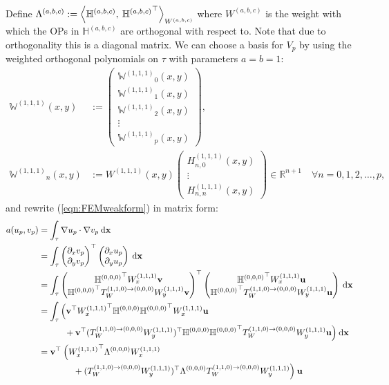 \documentclass[11pt, oneside]{article}   	%
\newcommand{\R}{\mathbb{R}}
\newcommand{\hdop}{H}
\newcommand{\bighdop}{\mathbb{\hdop}}
\newcommand{\element}{\tau}
\newcommand{\Wabc}{{W^{(a,b,c)}}}
\newcommand{\Wiii}{W^{(1,1,1)}}
\newcommand{\hdopiii}{\hdop^{(1,1,1)}}
\newcommand{\bighdopooo}{{\mathbb{\hdop}^{(0,0,0)}}}
\newcommand{\bigWiii}{{\mathbb{W}^{(1,1,1)}}}
\begin{document}
Define $\Lambda^{(a,b,c)} :=  \ip< \bighdop^{(a,b,c)}, \: {\bighdop^{(a,b,c)}}^\top >_{\Wabc}$ where $\Wabc$ is the weight with which the OPs in $\bighdop^{(a,b,c)}$ are orthogonal with respect to. Note that due to orthogonality this is a diagonal matrix. We can choose a basis for $V_p$ by using the weighted orthogonal polynomials on $\element$ with parameters $a = b = 1$:
\begin{align*}
\bigWiii(x,y) &:= \begin{pmatrix}
		\bigWiii_0(x,y) \\
		\bigWiii_1(x,y) \\
		\bigWiii_2(x,y) \\
		\vdots \\
		\bigWiii_p(x,y)
	\end{pmatrix}, \\
\bigWiii_n(x,y) &:=  \Wiii(x,y) \begin{pmatrix}
						\hdopiii_{n,0}(x,y) \\
						\vdots \\
						\hdopiii_{n,n}(x,y)
					\end{pmatrix} \in \R^{n+1} \quad \forall n = 0,1,2,\dots,p,
\end{align*}
and rewrite (\ref{eqn:FEMweakform}) in matrix form:
\begin{align*}
	a(u_p,v_p) &= \int_\element \nabla u_p \cdot \nabla v_p \: \D \mathbf{x} \\
	&= \int_\element \begin{pmatrix}
					\partial_x v_p \\
					\partial_y v_p
				\end{pmatrix}^\top 
				\begin{pmatrix}
					\partial_x u_p \\
					\partial_y u_p
				\end{pmatrix} \: \D \mathbf{x}
				\\
	&= \int_\element \begin{pmatrix}
					\bighdopooo^\top \Wiii_x \mathbf{v} \\
					\bighdopooo^\top T_W^{(1,1,0)\to(0,0,0)} \Wiii_y \mathbf{v}
				\end{pmatrix}^\top 
				\begin{pmatrix}
					\bighdopooo^\top \Wiii_x \mathbf{u} \\
					\bighdopooo^\top T_W^{(1,1,0)\to(0,0,0)} \Wiii_y \mathbf{u}
				\end{pmatrix} \: \D \mathbf{x}
				\\
	&= \int_\element \Big( \mathbf{v}^\top {\Wiii_x}^\top \bighdopooo \bighdopooo^\top \Wiii_x \mathbf{u} \nonumber \\
					& \quad \quad \quad + \mathbf{v}^\top ({T_W^{(1,1,0)\to(0,0,0)} \Wiii_y})^\top \bighdopooo \bighdopooo^\top T_W^{(1,1,0)\to(0,0,0)} \Wiii_y \mathbf{u}  \Big) \: \D \mathbf{x} \\
	&= \mathbf{v}^\top \: \Big( {\Wiii_x}^\top \Lambda^{(0,0,0)} \Wiii_x \\
	& \quad \quad \quad \quad + ({T_W^{(1,1,0)\to(0,0,0)} \Wiii_y})^\top \Lambda^{(0,0,0)} T_W^{(1,1,0)\to(0,0,0)} \Wiii_y \Big) \: \mathbf{u}
\end{align*}
\end{document}
